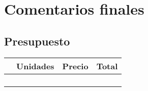 

\chapter{Comentarios finales}
\label{chap:conclusiones}

\section{Presupuesto}


\begin{table}[H]
  \begin{center}
    \begin{tabular}{|p{8cm}|p{2cm}|p{2cm}|p{2cm}|}
      \hline
      \vspace{+0.2in}{\textbf{Descripción}} & {\textbf{Unidades}} & {\textbf{Precio \EUR{}}} & {\textbf{Total \EUR{}}}\\
      \hline
      \vspace{+0.2in}{Raspberry Pi 3 Modelo B} &  \vspace{+0.2in}{1} &  \vspace{+0.2in}{38,7} &  \vspace{+0.2in}{38,7}\\
      \hline
      \vspace{+0.2in}{Lipo batería (3.7v, 600mAh Lipo) } & \vspace{+0.2in}{1} & \vspace{+0.2in}{13,99} & \vspace{+0.2in}{13,99}\\
      \hline
      \vspace{+0.2in}{Indicador Tester de baterías Lipo} & \vspace{+0.2in}{1} & \vspace{+0.2in}{8,90} & \vspace{+0.2in}{8,90}\\
      \hline      
      \vspace{+0.2in}{Cargador baterías Lipo} & \vspace{+0.2in}{1} & \vspace{+0.2in}{21,90} & \vspace{+0.2in}{21,90}\\
      \hline

\end{tabular}
\end{center}
\end{table}
